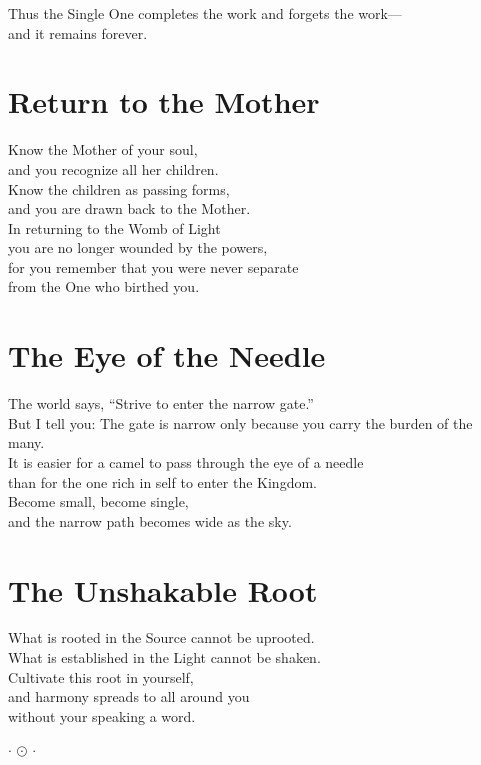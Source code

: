 \documentclass[10pt, openright]{book}
\newcommand{\ornament}{
    \vspace{1.5cm}
    \begin{center}
        \large $\cdot$ $\odot$ $\cdot$
    \end{center}
    \vspace{1.5cm}
}
\begin{document}
Thus the Single One completes the work and forgets the work— \\
and it remains forever.

\section{Return to the Mother}
Know the Mother of your soul, \\
and you recognize all her children. \\
Know the children as passing forms, \\
and you are drawn back to the Mother. \\

In returning to the Womb of Light \\
you are no longer wounded by the powers, \\
for you remember that you were never separate \\
from the One who birthed you.

\section{The Eye of the Needle}
The world says, ``Strive to enter the narrow gate.'' \\
But I tell you: The gate is narrow only because you carry the burden of the many. \\

It is easier for a camel to pass through the eye of a needle \\
than for the one rich in self to enter the Kingdom. \\
Become small, become single, \\
and the narrow path becomes wide as the sky.

\section{The Unshakable Root}
What is rooted in the Source cannot be uprooted. \\
What is established in the Light cannot be shaken. \\

Cultivate this root in yourself, \\
and harmony spreads to all around you \\
without your speaking a word.

\ornament

\end{document}
